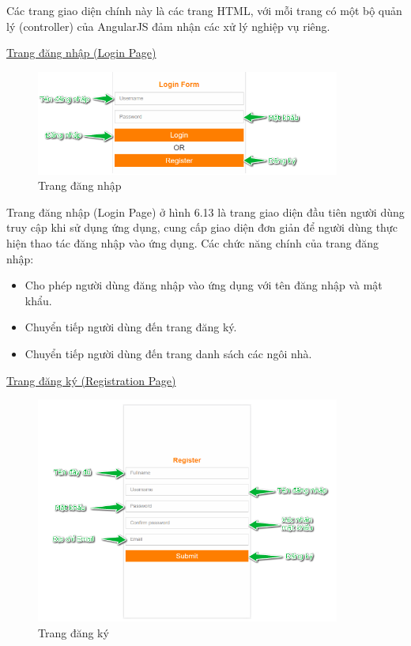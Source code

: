 \documentclass[12pt,a4paper,oneside]{extbook}
\begin{document}
Các trang giao diện chính này là các trang HTML, với mỗi trang có một bộ quản lý (controller) của AngularJS đảm nhận các xử lý nghiệp vụ riêng.

\underline{Trang đăng nhập (Login Page)}

\begin{figure}[h]
  \centering
     \includegraphics[width=10cm]{6-LoginPage}
  \caption{Trang đăng nhập}\label{fig:6-LoginPage}
\end{figure}

Trang đăng nhập (Login Page) ở hình 6.13 là trang giao diện đầu tiên người dùng truy cập khi sử dụng ứng dụng, cung cấp giao diện đơn giản để người dùng thực hiện thao tác đăng nhập vào ứng dụng. Các chức năng chính của trang đăng nhập:

\begin{itemize}[topsep=1mm,itemsep=-0.5mm]
\item Cho phép người dùng đăng nhập vào ứng dụng với tên đăng nhập và mật khẩu.
\item Chuyển tiếp người dùng đến trang đăng ký.
\item Chuyển tiếp người dùng đến trang danh sách các ngôi nhà.
\vspace{1mm}
\end{itemize}

\underline{Trang đăng ký (Registration Page)}

\begin{figure}[h]
  \centering
     \includegraphics[width=10cm]{6-RegisterPage}
  \caption{Trang đăng ký}\label{fig:6-RegisterPage}
\end{figure}
\end{document}
